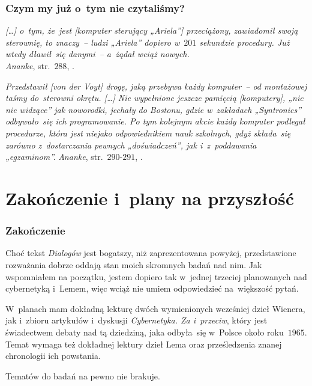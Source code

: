 \documentclass[10pt,t]{beamer}
\begin{document}
\begin{frame}
  \frametitle{Czym my już o~tym nie czytaliśmy?}


  \textit{[\ldots] o~tym, że~jest [komputer sterujący „Ariela”] przeciążony,
    zawiadomił swoją sterownię, to znaczy~-- ludzi „Ariela” dopiero w~$201$
    sekundzie procedury. Już wtedy dławił~się danymi~-- a~żądał wciąż
    nowych.} \\
  \textit{Ananke}, str.~$288$,
  \parencite{Lem-Ogrod-ciemnosci-i-inne-opowiadania-Pub-2017}.

  \textit{Przedstawił [von der Voyt] drogę, jaką przebywa każdy komputer~--
    od montażowej taśmy do~sterowni okrętu. [\ldots] Nie wypełnione jeszcze
    pamięcią [komputery], „nic nie widzące” jak noworodki, jechały do
    Bostonu, gdzie w~zakładach „Syntronics” odbywało~się ich programowanie.
    Po tym kolejnym akcie każdy komputer podlegał procedurze, która jest
    niejako odpowiednikiem nauk szkolnych, gdyż składa~się zarówno
    z~dostarczania pewnych „doświadczeń”, jak i~z~poddawania „egzaminom”.}
  \textit{Ananke}, str.~$290\text{-}291$,
  \parencite{Lem-Ogrod-ciemnosci-i-inne-opowiadania-Pub-2017}.

\end{frame}










\section{Zakończenie i~plany na przyszłość}



\begin{frame}
  \frametitle{Zakończenie}


  Choć tekst \textit{Dialogów} jest bogatszy, niż zaprezentowana powyżej,
  przedstawione rozważania dobrze oddają stan moich skromnych badań nad nim.
  Jak wspomniałem na początku, jestem dopiero tak w~jednej trzeciej
  planowanych nad cybernetyką i~Lemem, więc wciąż nie umiem odpowiedzieć
  na~większość pytań.

  W~planach mam dokładną lekturę dwóch wymienionych wcześniej dzieł
  Wienera, jak i~zbioru artykułów i~dyskusji \textit{Cybernetyka. Za
    i~przeciw}, który jest świadectwem debaty nad tą dziedziną, jaka
  odbyła~się w~Polsce około roku~$1965$. Temat wymaga też dokładnej lektury
  dzieł Lema oraz prześledzenia znanej chronologii ich powstania.

  Tematów do badań na pewno nie brakuje.

\end{frame}
\end{document}
